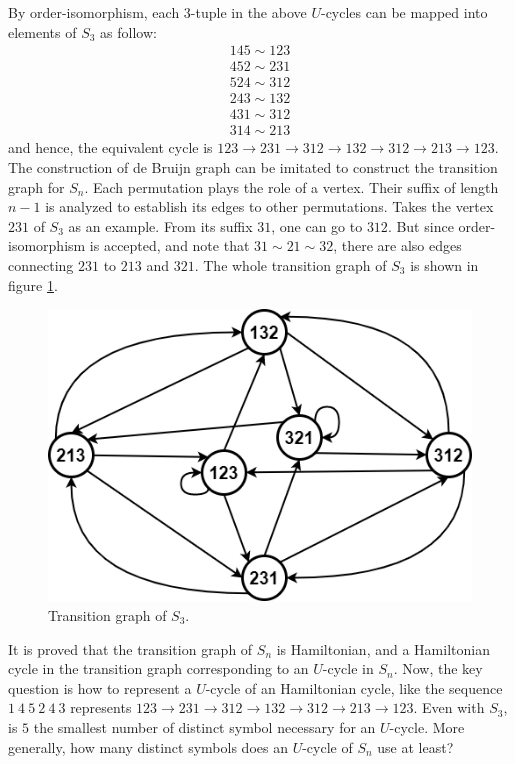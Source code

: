 By order-isomorphism, each $3$-tuple in the above $U$-cycles can be mapped into elements of $S_{3}$ as follow:
\begin{align*}
    145\sim123 \\
    452\sim231 \\
    524\sim312 \\
    243\sim132 \\
    431\sim312 \\
    314\sim213 
\end{align*}
and hence, the equivalent cycle is $123\rightarrow 231\rightarrow 312\rightarrow132\rightarrow312\rightarrow 213\rightarrow123 $. The construction of de Bruijn graph can be imitated to construct the transition graph for $S_{n}$. Each permutation plays the role of a vertex. Their suffix of length $n-1$ is analyzed to establish its edges to other permutations. Takes the vertex $231$ of $S_{3}$ as an example. From its suffix $31$, one can go to $312$. But since order-isomorphism is accepted, and note that $31\sim21\sim32$, there are also edges connecting $231$ to $213$ and $321$. The whole transition graph of $S_{3}$ is shown in figure \ref{fig:S3_graph}.

\begin{figure}[htbp]
    \centering
    \includegraphics[scale=0.5]{fig/PermutationGraph.png}
    \caption{Transition graph of $S_{3}$.}
    \label{fig:S3_graph}
\end{figure}

It is proved that the transition graph of $S_{n}$ is Hamiltonian, and a Hamiltonian cycle in the transition graph corresponding to an $U$-cycle in $S_{n}$. Now, the key question is how to represent a $U$-cycle of an Hamiltonian cycle, like the sequence $1\ 4\ 5\ 2\ 4\ 3$ represents $123\rightarrow 231\rightarrow 312\rightarrow132\rightarrow312\rightarrow 213\rightarrow123 $. Even with $S_{3}$, is $5$ the smallest number of distinct symbol necessary for an $U$-cycle. More generally, how many distinct symbols does an $U$-cycle of $S_{n}$ use at least? 

